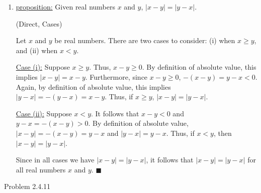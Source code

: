 \documentclass{article}
\theoremstyle{definition}
\begin{document}
	\begin{enumerate}
		\item[3] \underline{proposition:} Given real numbers $x$ and $y$,
		$|x-y|=|y-x|$.

		\vspace{.2cm}

		 (Direct, Cases)

		Let $x$ and $y$ be real numbers. There are two cases to consider:
		(i) when $x\ge y$, and (ii) when $x<y$.

		\underline{Case (i):}  Suppose $x\ge y$. Thus, $x-y\ge 0$. By
		definition of absolute value, this implies $|x-y|=x-y$. Furthermore,
		since $x-y\ge 0$, $-(x-y)=y-x<0$. Again, by definition of absolute
		value, this implies $|y-x|=-(y-x)=x-y$. Thus, if $x\ge y$,
		$|x-y|=|y-x|$.

		\underline{Case (ii):} Suppose $x<y$. It follows that $x-y<0$ and
		$y-x=-(x-y)>0$. By definition of absolute value, $|x-y|=-(x-y)=y-x$
		and $|y-x|=y-x$. Thus, if $x<y$, then $|x-y|=|y-x|$.

		Since in all cases we have $|x-y|=|y-x|$, it follows that
		$|x-y|=|y-x|$ for all real numbers $x$ and $y$.  $\blacksquare$
	\end{enumerate}

	\vspace{1cm}


	\noindent Problem 2.4.11  \vspace{0.3cm}
\end{document}
